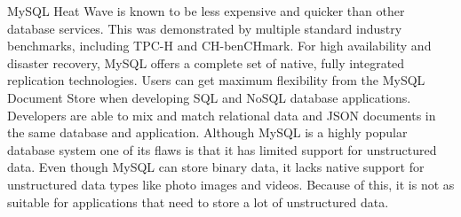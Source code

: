 MySQL Heat Wave is known to be less expensive and quicker than other database services. This was demonstrated by multiple standard industry benchmarks, including TPC-H and CH-benCHmark. For high availability and disaster recovery, MySQL offers a complete set of native, fully integrated replication technologies. Users can get maximum flexibility from the MySQL Document Store when developing SQL and NoSQL database applications. Developers are able to mix and match relational data and JSON documents in the same database and application. 
\newline \newline
Although MySQL is a highly popular database system one of its flaws is that it has limited support for unstructured data. Even though MySQL can store binary data, it lacks native support for unstructured data types like photo images and videos. Because of this, it is not as suitable for applications that need to store a lot of unstructured data.




